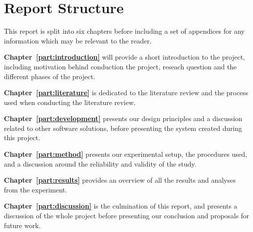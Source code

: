 \section{Report Structure}
This report is split into six chapters before including a set of appendices for any information which may be relevant to the reader.

\bigskip\noindent
\textbf{Chapter~\ref{part:introduction}} will provide a short introduction to the project, including motivation behind conduction the project, reseach question and the different phases of the project.

\bigskip\noindent
\textbf{Chapter~\ref{part:literature}} is dedicated to the literature review and the process used when conducting the literature review. 

\bigskip\noindent
\textbf{Chapter~\ref{part:development}} presents our design principles and a discussion related to other software solutions, before presenting the system created during this project. 

\bigskip\noindent
\textbf{Chapter~\ref{part:method}} presents our experimental setup, the procedures used, and a discussion around the reliability and validity of the study.

\bigskip\noindent
\textbf{Chapter~\ref{part:results}} provides an overview of all the results and analyses from the experiment.

\bigskip\noindent
\textbf{Chapter~\ref{part:discussion}} is the culmination of this report, and presents a discussion of the whole project before presenting our conclusion and proposals for future work. 

